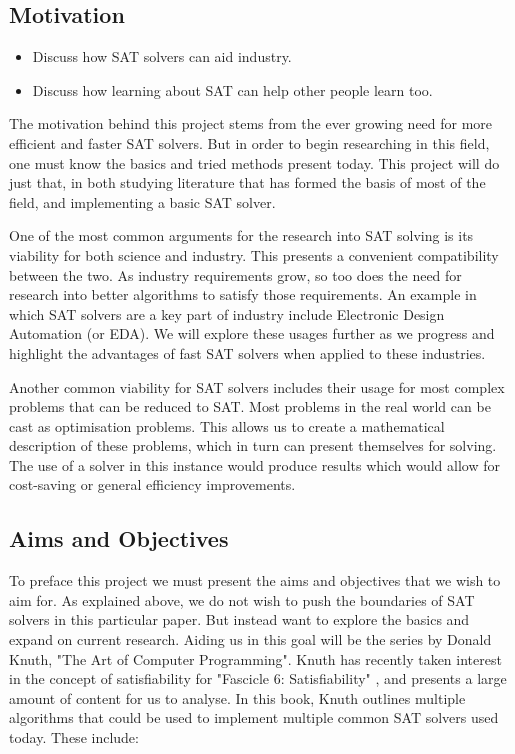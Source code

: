 \documentclass{article}
\begin{document}
\subsection{Motivation}
\begin{itemize}
    \item Discuss how SAT solvers can aid industry.
    \item Discuss how learning about SAT can help other people learn too.
\end{itemize}

The motivation behind this project stems from the ever growing need for more efficient and faster SAT solvers. But in order to begin researching in this field, one must know the basics and tried methods present today. This project will do just that, in both studying literature that has formed the basis of most of the field, and implementing a basic SAT solver. 

One of the most common arguments for the research into SAT solving is its viability for both science and industry. This presents a convenient compatibility between the two. As industry requirements grow, so too does the need for research into better algorithms to satisfy those requirements. An example in which SAT solvers are a key part of industry include Electronic Design Automation (or EDA). We will explore these usages further as we progress and highlight the advantages of fast SAT solvers when applied to these industries.

Another common viability for SAT solvers includes their usage for most complex problems that can be reduced to SAT. Most problems in the real world can be cast as optimisation problems. This allows us to create a mathematical description of these problems, which in turn can present themselves for solving. The use of a solver in this instance would produce results which would allow for cost-saving or general efficiency improvements.

\subsection{Aims and Objectives}
To preface this project we must present the aims and objectives that we wish to aim for. As explained above, we do not wish to push the boundaries of SAT solvers in this particular paper. But instead want to explore the basics and expand on current research. Aiding us in this goal will be the series by Donald Knuth, "The Art of Computer Programming". Knuth has recently taken interest in the concept of satisfiability for "Fascicle 6: Satisfiability" , and presents a large amount of content for us to analyse. In this book, Knuth outlines multiple algorithms that could be used to implement multiple common SAT solvers used today. These include: 
\end{document}
